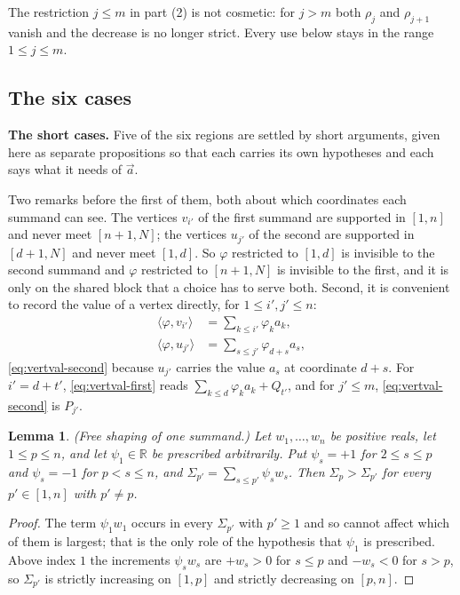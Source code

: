 \documentclass[11pt, a4paper, abstract=yes]{scrartcl}
\theoremstyle{definition}
\theoremstyle{remark}
\theoremstyle{plain}
\newtheorem{lemma}[definition]{Lemma}
\newcommand{\leannone}{\tikz[baseline=-0.6ex]\draw[leannone,line width=0.6pt] (0,0) circle (0.55ex);}
\newcommand{\leanmark}[1]{\leavevmode{\reversemarginpar\marginnote{\raggedleft#1}}}
\begin{document}
The restriction \(j\le m\) in part (2) is not cosmetic: for \(j>m\) both \(\rho_j\) and
\(\rho_{j+1}\) vanish and the decrease is no longer strict. Every use below stays in the range
\(1\le j\le m\).
\subsection{The six cases}
\label{sec-app-cases}
\textbf{The short cases.} Five of the six regions are settled by short arguments, given here as separate
propositions so that each carries its own hypotheses and each says what it needs of \(\vec a\).

Two remarks before the first of them, both about which coordinates each summand can see. The
vertices \(v_{i'}\) of the first summand are supported in \([1,n]\) and never meet \([n+1,N]\); the
vertices \(u_{j'}\) of the second are supported in \([d+1,N]\) and never meet \([1,d]\). So
\(\varphi\) restricted to \([1,d]\) is invisible to the second summand and \(\varphi\) restricted to
\([n+1,N]\) is invisible to the first, and it is only on the shared block that a choice has to serve
both. Second, it is convenient to record the value of a vertex directly, for \(1\le i',j'\le n\):
\begin{align}
  \langle\varphi,v_{i'}\rangle &= \sum_{k\le i'}\varphi_ka_k, \label{eq:vertval-first}\\
  \langle\varphi,u_{j'}\rangle &= \sum_{s\le j'}\varphi_{d+s}a_s, \label{eq:vertval-second}
\end{align}
\eqref{eq:vertval-second} because \(u_{j'}\) carries the value \(a_s\) at coordinate \(d+s\). For
\(i'=d+t'\), \eqref{eq:vertval-first} reads \(\sum_{k\le d}\varphi_ka_k+Q_{t'}\), and for
\(j'\le m\), \eqref{eq:vertval-second} is \(P_{j'}\).

\begin{lemma}
\leanmark{\leannone}(\emph{Free shaping of one summand.}) Let \(w_1,\dots,w_n\) be positive reals, let \(1\le p\le n\), and
let \(\psi_1\in\mathbb R\) be prescribed arbitrarily. Put \(\psi_s=+1\) for \(2\le s\le p\) and
\(\psi_s=-1\) for \(p<s\le n\), and \(\Sigma_{p'}=\sum_{s\le p'}\psi_sw_s\). Then \(\Sigma_p>\Sigma_{p'}\) for
every \(p'\in[1,n]\) with \(p'\ne p\).
\label{lem-shape}
\end{lemma}

\begin{proof}
The term \(\psi_1w_1\) occurs in every \(\Sigma_{p'}\) with \(p'\ge1\) and so cannot affect which of
them is largest; that is the only role of the hypothesis that \(\psi_1\) is prescribed. Above index
\(1\) the increments \(\psi_sw_s\) are \(+w_s>0\) for \(s\le p\) and \(-w_s<0\) for \(s>p\), so
\(\Sigma_{p'}\) is strictly increasing on \([1,p]\) and strictly decreasing on \([p,n]\).
\end{proof}
\end{document}
